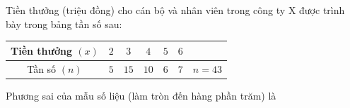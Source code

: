 \begin{ex}
Tiền thưởng (triệu đồng) cho cán bộ và nhân viên trong công ty X được trình bày trong bảng tần số sau:
\begin{center}
\begin{tabular}{|c|c|c|c|c|c|c|}\hline
Tiền thưởng $(x)$ & $2$ & $3$ & $4$ & $5$ & $6$ & \\\hline
Tần số $(n)$ & $5$ & $15$ & $10$ & $6$ & $7$ & $n=43$\\\hline
\end{tabular}
\end{center}
Phương sai của mẫu số liệu (làm tròn đến hàng phần trăm) là
\end{ex}
